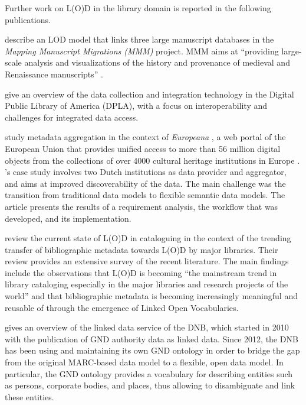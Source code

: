 Further work on L(O)D in the library domain is reported in the following publications.

\textcite{Burrows2021} describe an LOD model that links
three large manuscript databases
in the \emph{Mapping Manuscript Migrations (MMM)} project.
MMM aims at \enquote{providing large-scale analysis and visualizations of the history and provenance of medieval and Renaissance manuscripts} \autocite[p.3]{Burrows2021}.

\textcite{LigiaTriques2022} give an overview of the data collection and integration technology
in the Digital Public Library of America (DPLA), with a focus on
interoperability and challenges for integrated data access.

\textcite{Freire2019} study metadata aggregation in the context of \emph{Europeana} \autocite{Isaac2012,Petras2017},
a web portal of the European Union that provides unified access to 
more than 56 million digital objects
from the collections of over 4000 cultural heritage institutions in Europe \autocite{Europeana}.
\citeauthor{Freire2019}'s case study involves two Dutch institutions as data provider and aggregator,
and aims at improved discoverability of the data.
The main challenge was the transition from traditional data models to flexible semantic data models.
The article presents the results of a requirement analysis,
the workflow that was developed, and its implementation.

\textcite{Ullah2018} review the current state of L(O)D in cataloguing
in the context of the trending transfer of bibliographic metadata
towards L(O)D by major libraries.
Their review provides an extensive survey of the recent literature.
The main findings include
the observations that L(O)D is becoming
\enquote{the mainstream trend in library cataloging especially in the major libraries and research projects of the world} \autocite[p.47]{Ullah2018}
and that bibliographic metadata is becoming increasingly meaningful and reusable of through the emergence of Linked Open Vocabularies.

\textcite{Hauser2014} gives an overview of the linked data service
of the \gls{DNB},
which started in 2010 with the publication of \gls{GND} authority data as linked data.
Since 2012, the \gls{DNB} has been using and maintaining its own \gls{GND} ontology \autocite{GNDOntology}
in order to bridge the gap from the original MARC-based data model to a flexible, open data model.
In particular, the \gls{GND} ontology provides a vocabulary for describing entities such as persons, corporate bodies, and places,
thus allowing to disambiguate and link these entities.

